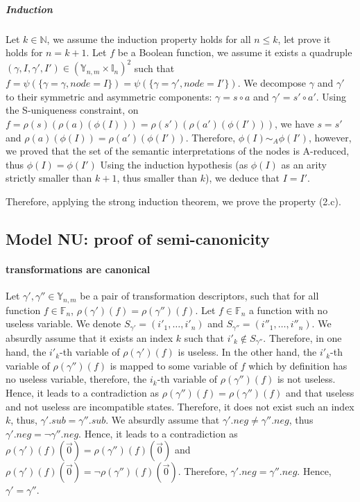 \documentclass[a4paper,10pt]{article}
\newcommand{\N}{\mathbb{N}}%
\newcommand{\F}{\mathbb{F}}
\newcommand{\Y}{\mathbb{Y}}
\newcommand{\I}{\mathbb{I}}
\begin{document}
\subparagraph{Induction}
Let $k\in\N$, we assume the induction property holds for all $n\leq k$, let prove it holds for $n = k+1$.
Let $f$ be a Boolean function, we assume it exists a quadruple $(\gamma, I, \gamma', I') \in (\Y_{n, m} \times \I_n)^2$ such that $f = \psi(\{\gamma = \gamma, node = I\}) = \psi(\{\gamma = \gamma', node = I'\})$.
We decompose $\gamma$ and $\gamma'$ to their symmetric and asymmetric components: $\gamma = s \circ a$ and $\gamma' = s' \circ a'$.
Using the S-uniqueness constraint, on $f = \rho(s)(\rho(a)(\phi(I))) = \rho(s')(\rho(a')(\phi(I')))$, we have $s = s'$ and $\rho(a)(\phi(I)) = \rho(a')(\phi(I'))$.
Therefore, $\phi(I) \sim_A \phi(I')$, however, we proved that the set of the semantic interpretations of the nodes is A-reduced, thus $\phi(I) = \phi(I')$
Using the induction hypothesis (as $\phi(I)$ as an arity strictly smaller than $k+1$, thus smaller than $k$), we deduce that $I = I'$.

Therefore, applying the strong induction theorem, we prove the property (2.c).

\subsection{Model NU: proof of semi-canonicity\label{grobdd-model-nu}}

\paragraph{transformations are canonical\\}
Let $\gamma', \gamma''\in\Y_{n, m}$ be a pair of transformation descriptors, such that for all function $f\in\F_n$, $\rho(\gamma')(f) = \rho(\gamma'')(f)$.
Let $f\in\F_n$ a function with no useless variable.
We denote $S_{\gamma'} = (i'_1, \dots, i'_n)$ and $S_{\gamma''} = (i''_1, \dots, i''_n)$.
We absurdly assume that it exists an index $k$ such that $i'_k \not\in S_{\gamma''}$.
Therefore, in one hand, the $i'_k$-th variable of $\rho(\gamma')(f)$ is useless.
In the other hand, the $i'_k$-th variable of $\rho(\gamma'')(f)$ is mapped to some variable of $f$ which by definition has no useless variable, therefore, the $i_k$-th variable of $\rho(\gamma'')(f)$ is not useless.
Hence, it leads to a contradiction as $\rho(\gamma'')(f) = \rho(\gamma'')(f)$ and that useless and not useless are incompatible states.
Therefore, it does not exist such an index $k$, thus, $\gamma'.sub = \gamma''.sub$.
We absurdly assume that $\gamma'.neg \neq \gamma''.neg$, thus $\gamma'.neg = \lnot \gamma''.neg$.
Hence, it leads to a contradiction as $\rho(\gamma')(f)(\vec{0}) = \rho(\gamma'')(f)(\vec{0})$ and $\rho(\gamma')(f)(\vec{0}) = \lnot \rho(\gamma'')(f)(\vec{0})$.
Therefore, $\gamma'.neg = \gamma''.neg$.
Hence, $\gamma' = \gamma''$.
\end{document}

